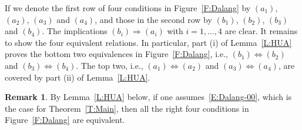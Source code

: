 \documentclass[a4paper,11pt]{article}%
\theoremstyle{plain}
\theoremstyle{definition}
\newtheorem{remark}[theorem]{Remark}
\numberwithin{equation}{section}
\begin{document}
If we denote the first row of four conditions in Figure~\ref{F:Dalang} by $(a_1)$, $(a_2)$, $(a_3)$
and $(a_4)$, and those in the second row by $(b_1)$, $(b_2)$, $(b_3)$ and $(b_4)$. The implications
$(b_i)\Rightarrow (a_i)$ with $i = 1,\dots, 4$ are clear. It remains to show the four equivalent
relations. In particular, part (i) of Lemma~\ref{L:HUA} proves the bottom two equivalences in
Figure~\ref{F:Dalang}, i.e., $(b_1)\Leftrightarrow (b_2)$ and $(b_3)\Leftrightarrow (b_4)$. The top
two, i.e., $(a_1)\Leftrightarrow (a_2)$ and $(a_3)\Leftrightarrow (a_4)$, are covered by part (ii)
of Lemma~\ref{L:HUA}.

\begin{remark}\label{R:4Equiv}
  By Lemma~\ref{L:HUA} below, if one assumes~\eqref{E:Dalang-00}, which is the case for
  Theorem~\ref{T:Main}, then all the right four conditions in Figure~\ref{F:Dalang} are equivalent.
\end{remark}
\end{document}
